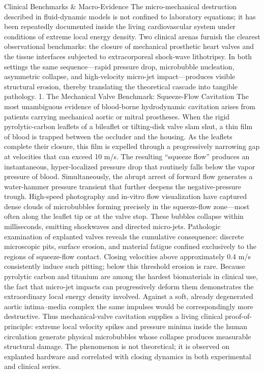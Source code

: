 Clinical Benchmarks & Macro-Evidence
The micro-mechanical destruction described in fluid-dynamic models is not confined to laboratory equations; it has been repeatedly documented inside the living cardiovascular system under conditions of extreme local energy density. Two clinical arenas furnish the clearest observational benchmarks: the closure of mechanical prosthetic heart valves and the tissue interfaces subjected to extracorporeal shock-wave lithotripsy. In both settings the same sequence—rapid pressure drop, microbubble nucleation, asymmetric collapse, and high-velocity micro-jet impact—produces visible structural erosion, thereby translating the theoretical cascade into tangible pathology.
1. The Mechanical Valve Benchmark: Squeeze-Flow Cavitation
The most unambiguous evidence of blood-borne hydrodynamic cavitation arises from patients carrying mechanical aortic or mitral prostheses. When the rigid pyrolytic-carbon leaflets of a bileaflet or tilting-disk valve slam shut, a thin film of blood is trapped between the occluder and the housing. As the leaflets complete their closure, this film is expelled through a progressively narrowing gap at velocities that can exceed 10 m/s. The resulting “squeeze flow” produces an instantaneous, hyper-localized pressure drop that routinely falls below the vapor pressure of blood. Simultaneously, the abrupt arrest of forward flow generates a water-hammer pressure transient that further deepens the negative-pressure trough.
High-speed photography and in-vitro flow visualization have captured dense clouds of microbubbles forming precisely in the squeeze-flow zone—most often along the leaflet tip or at the valve stop. These bubbles collapse within milliseconds, emitting shockwaves and directed micro-jets. Pathologic examination of explanted valves reveals the cumulative consequence: discrete microscopic pits, surface erosion, and material fatigue confined exclusively to the regions of squeeze-flow contact. Closing velocities above approximately 0.4 m/s consistently induce such pitting; below this threshold erosion is rare. Because pyrolytic carbon and titanium are among the hardest biomaterials in clinical use, the fact that micro-jet impacts can progressively deform them demonstrates the extraordinary local energy density involved. Against a soft, already degenerated aortic intima–media complex the same impulses would be correspondingly more destructive.
Thus mechanical-valve cavitation supplies a living clinical proof-of-principle: extreme local velocity spikes and pressure minima inside the human circulation generate physical microbubbles whose collapse produces measurable structural damage. The phenomenon is not theoretical; it is observed on explanted hardware and correlated with closing dynamics in both experimental and clinical series.
